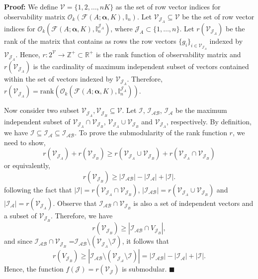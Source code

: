 {
\textbf{Proof: } We define $\mathcal V=\{1,2,\ldots,nK\}$  as the set of row vector indices for observability matrix $\mathcal O_k(\mathcal F(A;\mathbf{\alpha},K),\mathbb{I}_n)$. Let $\mathcal V_{\mathcal J_{A}} \subseteq \mathcal V$ be the set of row vector indices for $\mathcal O_k(\mathcal F(A;\mathbf{\alpha},K),\mathbb{I}_n^{\mathcal J_{A}})$, where $\mathcal J_{A}\subset \{1,\ldots,n\}$. Let $r(\mathcal V_{\mathcal J_{A}})$ be the rank of the matrix that contains as rows the row vectors $\{g_{i}\}_{i \in \mathcal V_{\mathcal J_{A}}}$ indexed by $\mathcal V_{\mathcal J_{A}}$. Hence, $r:2^{\mathcal V} \rightarrow \mathbb{Z}^{+}\subset \mathbb{R}^+$ is the rank function of observability matrix and $r(\mathcal V_{\mathcal J_{A}})$ is the cardinality of maximum independent subset of vectors contained within the set of vectors indexed by $\mathcal V_{\mathcal J_{A}}$. Therefore, $r(\mathcal V_{\mathcal J_{A}}) = \text{rank}(\mathcal O_k(\mathcal F(A;\mathbf{\alpha},K),\mathbb{I}_n^{\mathcal J_{A}}))$. 

Now consider two subset $\mathcal V_{\mathcal J_{A}},\mathcal V_{\mathcal J_{B}} \subseteq \mathcal V$. Let $\mathcal I$, $\mathcal I_{\mathcal A\mathcal B}$, $\mathcal I_{\mathcal A}$ be the maximum independent subset of $\mathcal V_{\mathcal J_{A}} \cap \mathcal V_{\mathcal J_{B}}$, $\mathcal V_{\mathcal J_{A}} \cup \mathcal V_{\mathcal J_{B}}$ and $\mathcal V_{\mathcal J_{A}}$, respectively. By definition, we have $\mathcal {I \subseteq I_{A} \subseteq I_{AB}}$. To prove the submodularity of the rank function $r$, we need to show,
\begin{equation}
	r(\mathcal V_{\mathcal J_{A}})+r(\mathcal V_{\mathcal J_{B}}) \geq r(\mathcal V_{\mathcal J_{A}} \cup \mathcal V_{\mathcal J_{B}})+r(\mathcal V_{\mathcal J_{A}} \cap \mathcal V_{\mathcal J_{B}})
\end{equation}
or equivalently,
\begin{equation}
	r(\mathcal V_{\mathcal J_{B}}) \geq \mathcal{|I_{AB}|}-\mathcal {|I_{A}|}+\mathcal{|I|}.
\end{equation}
following the fact that $|\mathcal I |=r(\mathcal V_{\mathcal J_{A}} \cap \mathcal V_{\mathcal J_{B}})$, $\mathcal {|I_{AB}|}=r(\mathcal V_{\mathcal J_{A}} \cup \mathcal V_{\mathcal J_{B}})$ and $\mathcal {|I_{A}|}=r(\mathcal V_{\mathcal J_{A}})$. Observe that $\mathcal{I_{AB}} \cap \mathcal V_{\mathcal J_{B}}$ is also a set of independent vectors  and a subset of $\mathcal V_{\mathcal J_{B}}$. Therefore, we have
\begin{equation}
      r(\mathcal V_{\mathcal J_{B}}) \geq |\mathcal{I_{AB}} \cap V_{\mathcal J_{B}}|,
\end{equation}
and since $\mathcal{I_{AB}} \cap \mathcal V_{\mathcal J_{B}}$ =$\mathcal{I_{AB}}\setminus (\mathcal V_{\mathcal J_{A}}\setminus \mathcal I)$, it follows that
\begin{equation}
      r(V_{\mathcal J_{B}}) \geq \mathcal{|\mathcal{I_{AB}\setminus (V_{J_{A}}\setminus I)}|}=\mathcal{|I_{AB}|}-\mathcal {|I_{A}|}+\mathcal{|I|}.
\end{equation}
Hence, the  function $f(\mathcal J)=r(\mathcal V_{\mathcal J})$  is submodular.
\hfill $\blacksquare$
}


